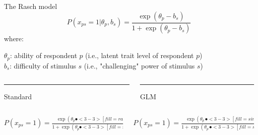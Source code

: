 \documentclass[compress]{beamer}
\begin{document}
\begin{frame}{The Rasch model}
	\begin{equation*}
		P(x_{ps} = 1| \theta_p, b_s) = \dfrac{\exp( \theta_p - b_s)}{1 + \exp(\theta_p - b_s)}
	\end{equation*}
	where: 
	
	$\theta_p$: ability of respondent $p$ (i.e., latent trait level of respondent $p$)\\
	$b_s$: difficulty of stimulus $s$ (i.e., "challenging" power of stimulus $s$)\\
	
	\vspace{2.5mm}
	\onslide<2-> 
	\begin{columns}[T] %
		\begin{column}{.50\linewidth}
			\textcolor{diff}{\rule{\linewidth}{2pt}}
			\begin{center}
				\textcolor{diff}{	\large{{Standard}}}
			\end{center}
			
		\end{column}
		
		\hfill%
		\begin{column}{.50\linewidth}
			\textcolor{single}{\rule{\linewidth}{2pt}}
			\begin{center}
				\textcolor{single}{\large{{GLM}}}	
			\end{center}
			
		\end{column}%
	\end{columns}
	
	\vspace{2.5mm}
	\begin{columns}[T]
		\begin{column}{.50\linewidth}
			\vspace*{2.5mm}
			$P(x_{ps} = 1) = \displaystyle \frac{\exp(\theta_p \spot<3-3>[fill=rasch!50]{-} b_s)}{1 + \exp(\theta_p \spot<3-3>[fill=rasch!50]{-} b_s)}$
		\end{column}
		\hfill
		
		\begin{column}{.50\linewidth}
			
			
			\vspace*{2.5mm}
			$P(x_{ps} = 1) = \displaystyle \frac{\exp(\theta_p \, \spot<3-3>[fill=single!50]{+} \, b_s)}{1 + \exp(\theta_p \, \spot<3-3>[fill=single!50]{+} \, b_s)}$
		\end{column}
	\end{columns}	
	
\end{frame}
\end{document}

